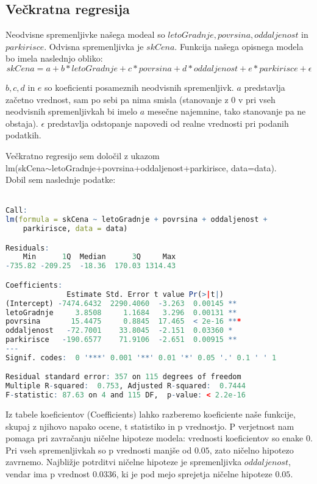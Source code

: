 \documentclass[a4paper, 12pt]{article}
\begin{document}
\subsection{Večkratna regresija}

Neodvisne spremenljivke našega modeal so $ letoGradnje, povrsina, oddaljenost $
in $ parkirisce $. Odvisna spremenljivka je $ skCena $. Funkcija našega
opisnega modela bo imela naslednjo obliko:
\begin{equation}
	skCena = a+b*letoGradnje+c*povrsina+d*oddaljenost+e*parkirisce+\epsilon
\end{equation}

$ b, c, d $ in $ e $ so koeficienti posameznih neodvisnih spremenljivk. $ a $
predstavlja začetno vrednost, sam po sebi pa nima smisla (stanovanje z $ 0 $ v
pri vseh neodvisnih spremenljivkah bi imelo $ a $ mesečne najemnine, tako
stanovanje pa ne obstaja). $ \epsilon $ predstavlja odstopanje napovedi od
realne vrednosti pri podanih podatkih.

Večkratno regresijo sem določil z ukazom \\
{\sf lm(skCena$\sim$letoGradnje+povrsina+oddaljenost+parkirisce, data=data)}. \\
Dobil sem naslednje podatke:
\\
\\
\begin{lstlisting}[language=R,basicstyle=\small,label={lst:1}]
Call:
lm(formula = skCena ~ letoGradnje + povrsina + oddaljenost +
	parkirisce, data = data)

Residuals:
    Min      1Q  Median      3Q     Max 
-735.82 -209.25  -18.36  170.03 1314.43 

Coefficients:
              Estimate Std. Error t value Pr(>|t|)    
(Intercept) -7474.6432  2290.4060  -3.263  0.00145 **
letoGradnje     3.8508     1.1684   3.296  0.00131 **
povrsina       15.4475     0.8845  17.465  < 2e-16 ***
oddaljenost   -72.7001    33.8045  -2.151  0.03360 *
parkirisce   -190.6577    71.9106  -2.651  0.00915 **
---
Signif. codes:  0 '***' 0.001 '**' 0.01 '*' 0.05 '.' 0.1 ' ' 1

Residual standard error: 357 on 115 degrees of freedom
Multiple R-squared:  0.753,	Adjusted R-squared:  0.7444
F-statistic: 87.63 on 4 and 115 DF,  p-value: < 2.2e-16
\end{lstlisting}

Iz tabele koeficientov (Coefficients) lahko razberemo koeficiente naše
funkcije, skupaj z njihovo napako ocene, t statistiko in p vrednostjo. P
verjetnost nam pomaga pri zavračanju ničelne hipoteze modela: vrednosti
koeficientov so enake $ 0 $. Pri vseh spremenljivkah so p vrednosti manjše od
$ 0.05 $, zato ničelno hipotezo zavrnemo. Najbližje potrditvi ničelne hipoteze
je spremenljivka $ oddaljenost $, vendar ima p vrednost $ 0.0336 $, ki je pod
mejo sprejetja ničelne hipoteze $ 0.05 $.
\end{document}
